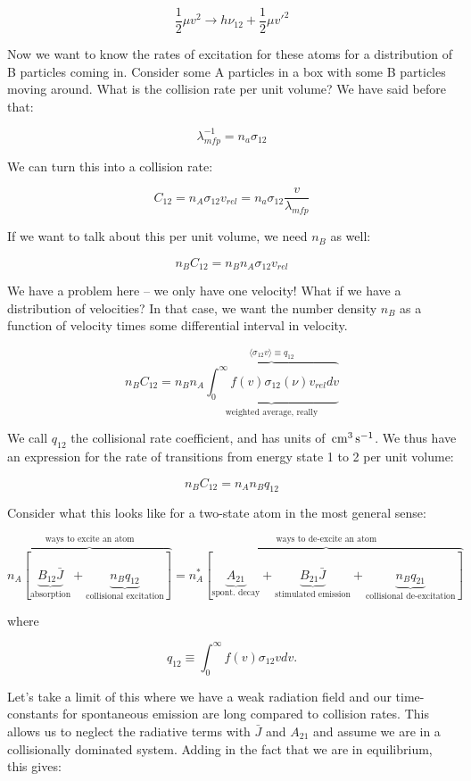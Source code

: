 \documentclass{article}
\newcommand{\unit}[1]{{\,\rm #1}}
\newcommand{\s}{\unit{s}}
\newcommand{\cm}{\unit{cm}}
\begin{document}
$$
\frac12 \mu v^2 \rightarrow h \nu_{12} + \frac12 \mu v'^{2}
$$

Now we want to know the rates of excitation for these atoms for a distribution of B particles coming in. Consider some A particles in a box with some B particles moving around. What is the collision rate per unit volume? We have said before that:

$$
\lambda_{mfp}^{-1} = n_a \sigma_{12} 
$$

We can turn this into a collision rate:

$$
C_{12} = n_A \sigma_{12} v_{rel} = n_a \sigma_{12} \frac{v}{\lambda_{mfp}}
$$

If we want to talk about this per unit volume, we need $n_B$ as well:

$$
n_B C_{12} = n_B n_A \sigma_{12} v_{rel}
$$

We have a problem here -- we only have one velocity! What if we have a distribution of velocities? In that case, we want the number density $n_B$ as a function of velocity times some differential interval in velocity. 

$$
n_B C_{12} = n_B n_A \overbrace{\underbrace{\int_{0}^{\infty} f(v) \sigma_{12}(\nu) v_{rel} dv}_\text{weighted average, really}}^{\langle \sigma_{12} v\rangle \equiv q_{12}}
$$

We call $q_{12}$ the collisional rate coefficient, and has units of $\cm^3 \s^{-1}$. We thus have an expression for the rate of transitions from energy state 1 to 2 per unit volume:

$$
n_B C_{12} = n_A n_B q_{12}
$$

Consider what this looks like for a two-state atom in the most general sense:

$$
\boxed{\overbrace{n_A \left[\underbrace{B_{12} \bar{J}}_\text{absorption} + \underbrace{n_B q_{12}}_\text{collisional excitation} \right]}^\text{ways to excite an atom} = \overbrace{n_A^* \left[\underbrace{A_{21}}_\text{spont. decay} +  \underbrace{B_{21}\bar{J}}_\text{stimulated emission} + \underbrace{n_B q_{21}}_\text{collisional de-excitation} \right]}^\text{ways to de-excite an atom}}
$$

where

$$
q_{12} \equiv \int_{0}^{\infty} f(v) \sigma_{12} v dv.
$$

Let's take a limit of this where we have a weak radiation field and our time-constants for spontaneous emission are long compared to collision rates. This allows us to neglect the radiative terms with $\bar{J}$ and $A_{21}$ and assume we are in a collisionally dominated system. Adding in the fact that we are in equilibrium, this gives:
\end{document}
